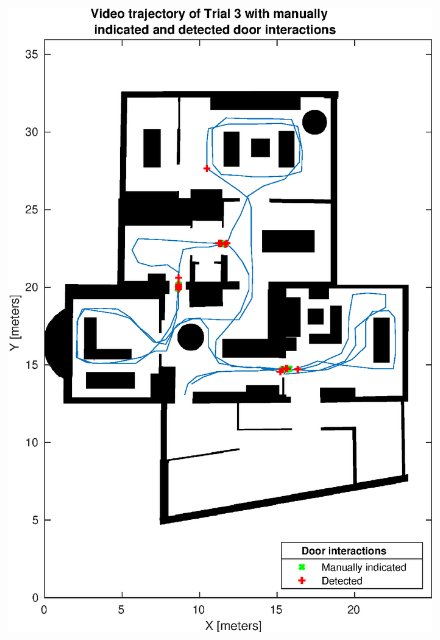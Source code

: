 \begin{figure}[H]
	\centering
	\includegraphics[width=0.7\linewidth]{images/20201129_2330_video_traj_Trial_3_door_detect_vs_manual_1}
	\setlength{\belowcaptionskip}{-10pt}
	\caption{}
	\label{fig:video_traj_trial3_door_detect_vs_manual_1}
\end{figure}
 
 
 
 